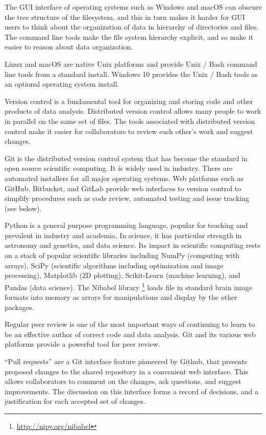 The GUI interface of operating systems such as Windows and macOS can obscure
the tree structure of the filesystem, and this in turn makes it harder for GUI
users to think about the organization of data in hierarchy of directories and
files.  The command line tools make the file system hierarchy explicit, and so
make it easier to reason about data organization.

Linux and macOS are native Unix platforms and provide Unix / Bash command line
tools from a standard install.  Windows 10 provides the Unix / Bash tools as
an optional operating system install.

Version control is a fundamental tool for organizing and storing code and
other products of data analysis.
Distributed version control allows many people to work in parallel on the
same set of files.
The tools associated with distributed version control make it easier for
collaborators to review each other's work and suggest changes.

Git is the distributed version control system that has become the standard in
open source scientific computing. It is widely used in industry.
There are automated installers for all major operating systems.
Web platforms such as GitHub, Bitbucket, and GitLab provide web interfaces
to version control to simplify procedures such as code review, automated
testing and issue tracking (see below).

Python is a general purpose programming language,
popular for teaching and prevalent in industry and academia.
In science, it has particular strength in
astronomy and genetics, and data science.
Its impact in scientific computing rests on a stack of popular scientific
libraries including NumPy (computing with arrays), SciPy (scientific
algorithms including optimization and image processing), Matplotlib (2D
plotting), Scikit-Learn (machine learning), and Pandas (data science).  The
Nibabel library \footnote{\url{http://nipy.org/nibabel}\label{nibabel}} loads
file in standard brain image formats into memory as arrays for manipulations
and display by the other packages.

Regular peer review is one of the most important ways of continuing to learn
to be an effective author of correct code and data analysis.  Git and its
various web platforms provide a powerful tool for peer review.

``Pull requests'' are a Git interface feature pioneered by Github, that
presents proposed changes to the shared repository in a convenient web
interface. This allows collaborators to comment on the changes, ask questions,
and suggest improvements.  The discussion on this interface forms a record of
decisions, and a justification for each accepted set of changes.

